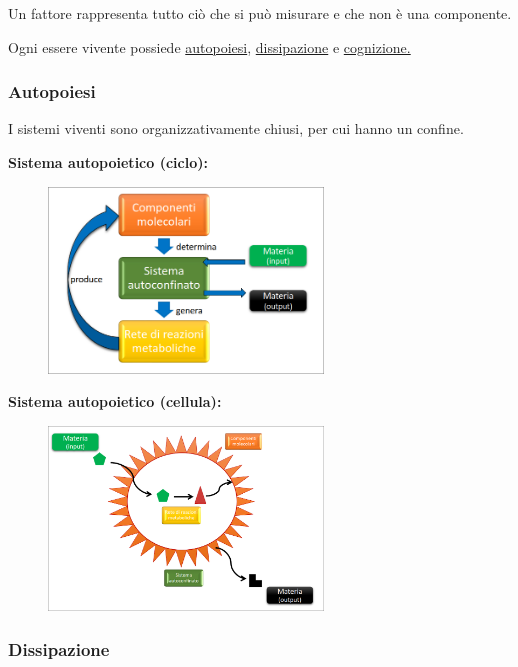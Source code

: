 \documentclass[a4paper]{article}
\begin{document}
Un fattore rappresenta tutto ciò che si può misurare e che non è una componente.

Ogni essere vivente possiede \underline{autopoiesi}, \underline{dissipazione} e \underline{cognizione.}

\subsubsection{Autopoiesi}

I sistemi viventi sono organizzativamente chiusi, per cui hanno un confine.

\pagebreak

\textbf{Sistema autopoietico (ciclo):}
\begin{figure}[ht]
    \centering
    \includegraphics[width=0.65\textwidth]{./sis_autop_ciclo.png}
\end{figure}

\textbf{Sistema autopoietico (cellula):}
\begin{figure}[ht]
    \centering
    \includegraphics[width=0.65\textwidth]{./sis_autop_cellula.png}
\end{figure}

\subsubsection{Dissipazione}
\end{document}
